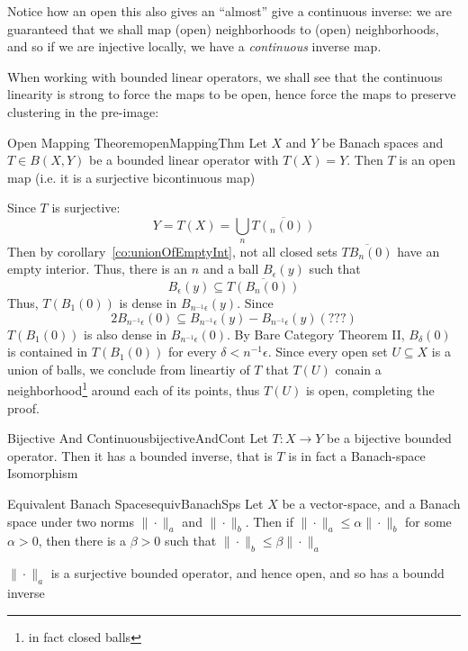 \documentclass[oneside]{book}
\newcommand{\sse}{\subseteq}
\newcommand{\oln}{\overline}
\begin{document}
Notice how an open this also gives an ``almost'' give a continuous inverse: we are guaranteed that we shall
map (open) neighborhoods to (open) neighborhoods, and so if we are injective locally, we have a
\emph{continuous} inverse map.

When working with bounded linear operators, we shall see that the continuous linearity is strong to force the
maps to be open, hence force the maps to preserve clustering in the pre-image:

\begin{thm}{Open Mapping Theorem}{openMappingThm}
	Let $X$ and $Y$ be Banach spaces and $T \in B(X,Y)$ be a bounded linear operator with $T(X) = Y$. Then $T$
	is an open map (i.e. it is a surjective bicontinuous map)
\end{thm}

\begin{Proof}
	Since $T$ is surjective:
	\[
		Y = T(X) = \bigcup_n \oln{T(_n(0))}
	\]
	Then by corollary~\ref{co:unionOfEmptyInt}, not all closed sets $\oln{TB_n(0)}$ have an empty interior. Thus, there
	is an $n$ and a ball $B_\epsilon(y)$ such that
	\[
		B_\epsilon(y) \sse \oln{T(B_n(0))}
	\]
	Thus, $T(B_1(0))$ is dense in $B_{n^{-1}\epsilon}(y)$. Since
	\[
		2B_{n^{-1}\epsilon}(0) \sse B_{n^{-1}\epsilon}(y) - B_{n^{-1}\epsilon}(y) (\text{???})
	\]
	$T(B_1(0))$ is also dense in $B_{n^{-1}\epsilon}(0)$. By Bare Category Theorem II, $B_\delta(0)$ is
contained in $T(B_1(0))$ for every $\delta < n^{-1}\epsilon$. Since every open set $U \sse X$ is a union of balls, we
conclude from lineartiy of $T$ that $T(U)$ conain a neighborhood\footnote{in fact closed balls} around each
of its points, thus $T(U)$ is open, completing the proof.
\end{Proof}


\begin{cor}{Bijective And Continuous}{bijectiveAndCont}
	Let $T: X \to Y$ be a bijective bounded operator. Then it has a bounded inverse, that is $T$ is in fact
	a Banach-space Isomorphism
\end{cor}

\begin{cor}{Equivalent Banach Spaces}{equivBanachSps}
	Let $X$ be a vector-space, and a Banach space under two norms $\|\cdot\|_a$ and $\|\cdot\|_b$. Then if
	$\|\cdot\|_a \le \alpha \|\cdot \|_b$ for some $\alpha > 0$, then there is a $\beta > 0$ such that $\|\cdot\|_b
	\le \beta \|\cdot\|_a$
\end{cor}

\begin{Proof}
	$\|\cdot\|_a$ is a surjective bounded operator, and hence open, and so has a boundd inverse
\end{Proof}
\end{document}
